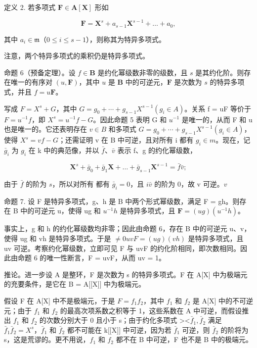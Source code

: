 定义 2. 若多项式 \(\mathbf{F} \in \mathbf{A}[\mathbf{X}]\) 形如

\[
\mathbf {F} = \mathbf {X} ^ {s} + a _ {s - 1} \mathbf {X} ^ {s - 1} + \dots + a _ {0},
\]

其中 \(a_{i} \in \mathfrak{m}\)（\(0 \leqslant i \leqslant s - 1\)），则称其为特异多项式。

注意，两个特异多项式的乘积仍是特异多项式。

命题 6（预备定理）。设 \(f \in \mathbf{B}\) 是约化幂级数非零的级数，且 \(s\) 是其约化阶。则存在唯一的有序对 \((u, \mathbf{F})\)，其中 \(u\) 是 \(\mathbf{B}\) 中的可逆元，\(\mathbf{F}\) 是次数为 \(s\) 的特异多项式，并且 \(f = u\mathbf{F}\)。

写成 \(F = X^{s} + G\)，其中 \(G = g_{0} + \cdots + g_{s-1}X^{s-1} (g_{i} \in A)\)。关系 f = uF 等价于 \(F = u^{-1}f\)，即 \(X^{s} = u^{-1}f - G\)。因此命题 5 表明 G 和 \(u^{-1}\) 是唯一的，从而 F 和 u 也是唯一的。它还表明存在 \(v \in B\) 和多项式 \(G = g_{0} + \cdots + g_{s-1}X^{s-1} (g_{i} \in A)\)，使得 \(X^{s} = vf - G\)；还需证明 v 在 B 中可逆，且对所有 i 都有 \(g_{i} \in m\)。现在，记 \(\bar{g}_{i}\) 为 \(g_{i}\) 在 k 中的典范像，并以 \(\bar{f}\)、\(\bar{v}\) 表示 f、g 的约化幂级数，

\[
\mathbf {X} ^ {s} + \bar {g} _ {0} + \bar {g} _ {1} \mathbf {X} + \dots + \bar {g} _ {s - 1} \mathbf {X} ^ {s - 1} = \bar {f} \bar {v};
\]

由于 \(\bar{f}\) 的阶为 \(s\)，所以对所有  都有 \(\bar{g}_i = 0\)，且 \(i\)\(\bar{v}\) 的阶为 0，故 v 可逆。\(v\)

命题 7. 设 F 是特异多项式，g、h 是 B 中两个形式幂级数，满足 F = gh。则存在 B 中的可逆元 u，使得 ug 和 \(u^{-1}h\) 是特异多项式，且 \(\mathbf{F} = (ug)(u^{-1}h)\)。

事实上，g 和 h 的约化幂级数均非零；因此由命题 6，存在 B 中的可逆元 u、v，使得 ug 和 vh 是特异多项式。于是 \(\neq0\)\(uvF = (ug)(vh)\) 是特异多项式，且 uv 可逆。考察约化幂级数，立即可见 F 与 uvF 的约化阶相同，即次数相同。因此由命题 6 的唯一性断言，F = uvF，从而 uv = 1。

推论。进一步设 A 是整环，F 是次数为 s 的特异多项式。F 在 A{[}X{]} 中为极端元的充要条件，是它在 B = A{[}{[}X{]}{]} 中为极端元。

假设 F 在 A{[}X{]} 中不是极端元，于是 \(F = f_{1}f_{2}\)，其中 \(f_{1}\) 和 \(f_{2}\) 是 A{[}X{]} 中的不可逆元；由于 \(f_{1}\) 和 \(f_{2}\) 的最高次项系数之积等于 1，这些系数在 A 中可逆，而假设推出 \(f_{1}\) 和 \(f_{2}\) 的次数分别大于 0 且小于 s；由于约化多项式 \textgreater\textless\(\bar{f}_{1}, \bar{f}_{2}\) 满足 \(\bar{f}_{1}\bar{f}_{2} = X^{s}\)，\(\bar{f}_{1}\) 和 \(\bar{f}_{2}\) 都不可能在 k{[}{[}X{]}{]} 中可逆，因为若 \(\bar{f}_{1}\) 可逆，则 \(\bar{f}_{2}\) 的阶将为 s，这是荒谬的。更不用说，\(f_{1}\) 和 \(f_{2}\) 都不在 B 中可逆，F 也不是 B 中的极端元。

